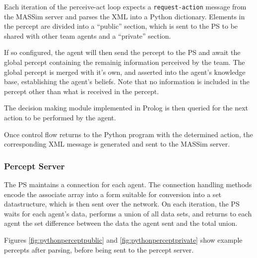     Each iteration of the perceive-act loop expects a \texttt{request-action}
    message from the MASSim server and parses the XML into a Python dictionary.
    Elements in the percept are divided into a ``public'' section, which is sent
    to the PS to be shared with other team agents and a ``private''
    section.

    If so configured, the agent will then send the percept to the PS and await
    the global percept containing the remainig information perceived by the
    team. The global percept is merged with it's own, and asserted into the
    agent's knowledge base, establishing the agent's beliefs.  Note that no
    information is included in the percept other than what is received in the
    percept.

    The decision making module implemented in Prolog is then queried for the
    next action to be performed by the agent.
    
    Once control flow returns to the Python program with the determined action,
    the corresponding XML message is generated and sent to the MASSim server. 

\subsubsection{Percept Server}
    The PS maintains a connection for each agent. 
    The connection handling methods encode the associate array into a form
    suitable for conversion into a set datastructure, which is then sent over
    the network. 
    On each iteration, the PS waits for each agent's data, performs a union of
    all data sets, and returns to each agent the set difference between the data
    the agent sent and the total union.

    Figures \ref{fig:pythonperceptpublic} and \ref{fig:pythonperceptprivate}
    show example percepts after parsing, before being sent to the percept
    server.

